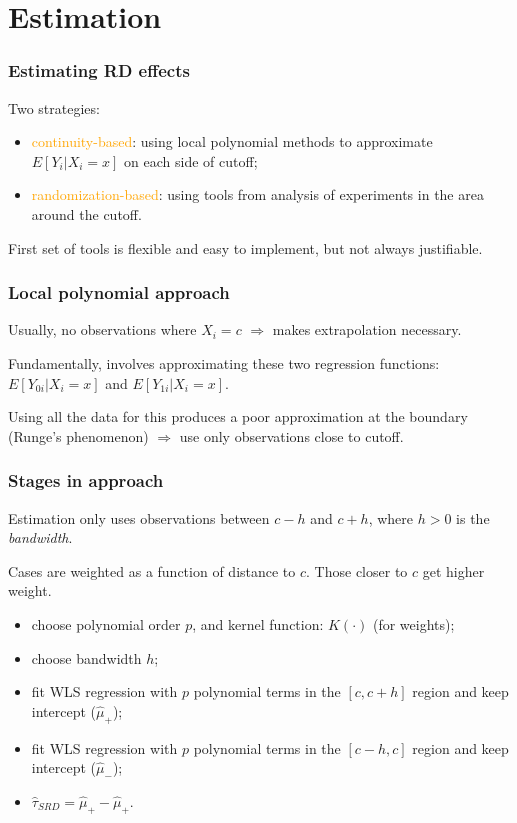 \documentclass[12pt,english,dvipsnames,aspectratio=169,handout]{beamer}\usepackage[]{graphicx}\usepackage[]{xcolor}
\begin{document}
\section{Estimation}

\begin{frame}
\frametitle{Estimating RD effects}
Two strategies:

\begin{itemize}
\setlength\itemsep{1.5em}
\item \textcolor{orange}{continuity-based}: using local polynomial methods to approximate $E[Y_i | X_i=x]$ on each side of cutoff;
\pause
\item \textcolor{orange}{randomization-based}: using tools from analysis of experiments in the area around the cutoff.
\end{itemize}\bigskip
\pause

First set of tools is flexible and easy to implement, but not always justifiable.

\end{frame}


\begin{frame}
\frametitle{Local polynomial approach}
Usually, no observations where $X_i=c$ $\Rightarrow$ makes extrapolation necessary.\bigskip
\pause

Fundamentally, involves approximating these two regression functions: $E[Y_{0i} | X_i=x]$ and $E[Y_{1i} | X_i=x]$.\bigskip
\pause

Using all the data for this produces a poor approximation at the boundary (Runge's phenomenon) $\Rightarrow$ use only observations close to cutoff.

\end{frame}


\begin{frame}
\frametitle{Stages in approach}
Estimation only uses observations between $c - h$ and $c + h$, where $h>0$ is the \textit{bandwidth}.\pause

Cases are weighted as a function of distance to $c$. Those closer to $c$ get higher weight.\pause

\begin{itemize}
\footnotesize
\item choose polynomial order $p$, and kernel function: $K(\cdot)$ (for weights);\pause
\item choose bandwidth $h$;\pause
\item fit WLS regression with $p$ polynomial terms in the $[c, c+h]$ region and keep intercept ($\hat{\mu}_+$);\pause
\item fit WLS regression with $p$ polynomial terms in the $[c-h, c]$ region and keep intercept ($\hat{\mu}_-$);\pause
\item $\hat{\tau}_{SRD} = \hat{\mu}_+ - \hat{\mu}_+$.
\end{itemize}

\end{frame}
\end{document}

